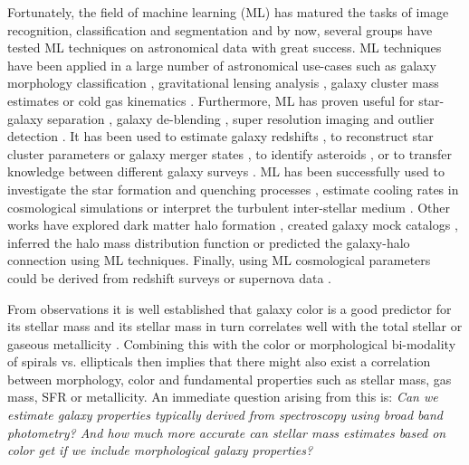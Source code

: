 \documentclass[useAMS,usenatbib]{mnras}
\begin{document}
Fortunately, the field of machine learning (ML) has matured the tasks of image recognition, classification and segmentation \citep[e.g.][]{Ronneberger2015} and by now, several groups have tested ML techniques on astronomical data with great success. ML techniques have been applied in a large number of astronomical use-cases such as galaxy morphology classification \citep[e.g.][]{Dieleman2015,Huertas-Company2015,Beck2018,Hocking2018}, gravitational lensing analysis \citep[e.g.][]{Hezaveh2017,Lanusse2018,Petrillo2017,Petrillo2019,Jeffrey2020}, galaxy cluster mass estimates \citep[e.g.][]{Ntampaka2015,Ntampaka2018,Ntampaka2019,Ho2019} or cold gas kinematics \citep{Dawson2020}. Furthermore, ML has proven useful for star-galaxy separation \citep[e.g.][]{Kim2017,Bai2019}, galaxy de-blending \citep{Lanusse2019}, super resolution imaging \citep[e.g.][]{Falahkheirkhah2019} and outlier detection \citep{Margalef2020}. It has been used to estimate galaxy redshifts \citep{Soo2018,Menou2019,Wilson2020,Campagne2020}, to reconstruct star cluster parameters \citep{Pasquato2016,Pasquato2019} or galaxy merger states \citep{Bottrell2019}, to identify asteroids \citep[e.g.][]{Smirnov2017}, or to transfer knowledge between different galaxy surveys \citep{Dominguez2019,Perez2019}. ML has been successfully used to investigate the star formation and quenching processes \citep{Lovell2019,Bluck2020}, estimate cooling rates in cosmological simulations \citep{Galligan2019} or interpret the turbulent inter-stellar medium \citep[ISM,][]{Peek2019,vanOort2019}. Other works have explored dark matter halo formation \citep{Lucie-Smith2019}, created galaxy mock catalogs \citep[e.g.][]{Xu2013,Kamdar2016}, inferred the halo mass distribution function \citep{Charnock2020} or predicted the galaxy-halo connection \citep{Agarwal2018,Jo2019} using ML techniques. Finally, using ML cosmological parameters could be derived from redshift surveys \citep{Ramanah2019,Ntampaka2020} or supernova data \citep{Escamilla2020,Wang2020}.
	
From observations it is well established that galaxy color is a good predictor for its stellar mass \citep[e.g.][]{Bell2003,Zibetti2009} and its stellar mass in turn correlates well with the total stellar or gaseous metallicity \citep[e.g.][]{Tremonti2004,Gallazzi2005}. Combining this with the color or morphological bi-modality of spirals vs. ellipticals then implies that there might also exist a correlation between morphology, color and fundamental properties such as stellar mass, gas mass, SFR or metallicity. An immediate question arising from this is: \textit{Can we estimate galaxy properties typically derived from spectroscopy using broad band photometry? And how much more accurate can stellar mass estimates based on color get if we include morphological galaxy properties?}  
\end{document}
